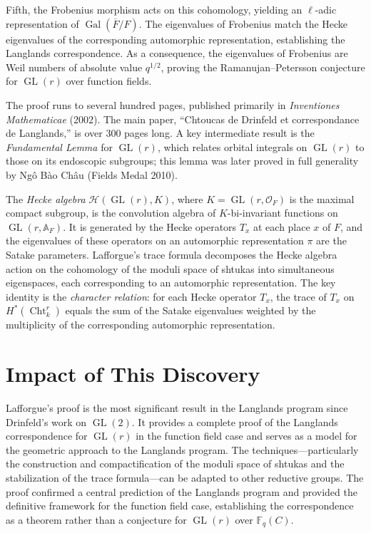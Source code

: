 Fifth, the Frobenius morphism acts on this cohomology, yielding an $\ell$-adic representation of $\operatorname{Gal}(\overline{F}/F)$. The eigenvalues of Frobenius match the Hecke eigenvalues of the corresponding automorphic representation, establishing the Langlands correspondence. As a consequence, the eigenvalues of Frobenius are Weil numbers of absolute value $q^{1/2}$, proving the Ramanujan--Petersson conjecture for $\operatorname{GL}(r)$ over function fields.

The proof runs to several hundred pages, published primarily in \emph{Inventiones Mathematicae} (2002). The main paper, ``Chtoucas de Drinfeld et correspondance de Langlands,'' is over 300 pages long. A key intermediate result is the \emph{Fundamental Lemma} for $\operatorname{GL}(r)$, which relates orbital integrals on $\operatorname{GL}(r)$ to those on its endoscopic subgroups; this lemma was later proved in full generality by Ngô Bào Châu (Fields Medal 2010).

The \emph{Hecke algebra} $\mathcal{H}(\operatorname{GL}(r), K)$, where $K = \operatorname{GL}(r, \mathcal{O}_F)$ is the maximal compact subgroup, is the convolution algebra of $K$-bi-invariant functions on $\operatorname{GL}(r, \mathbb{A}_F)$. It is generated by the Hecke operators $T_x$ at each place $x$ of $F$, and the eigenvalues of these operators on an automorphic representation $\pi$ are the Satake parameters. Lafforgue's trace formula decomposes the Hecke algebra action on the cohomology of the moduli space of shtukas into simultaneous eigenspaces, each corresponding to an automorphic representation. The key identity is the \emph{character relation}: for each Hecke operator $T_x$, the trace of $T_x$ on $H^*(\operatorname{Cht}^r_k)$ equals the sum of the Satake eigenvalues weighted by the multiplicity of the corresponding automorphic representation.

\section{Impact of This Discovery}

Lafforgue's proof is the most significant result in the Langlands program since Drinfeld's work on $\operatorname{GL}(2)$. It provides a complete proof of the Langlands correspondence for $\operatorname{GL}(r)$ in the function field case and serves as a model for the geometric approach to the Langlands program. The techniques---particularly the construction and compactification of the moduli space of shtukas and the stabilization of the trace formula---can be adapted to other reductive groups. The proof confirmed a central prediction of the Langlands program and provided the definitive framework for the function field case, establishing the correspondence as a theorem rather than a conjecture for $\operatorname{GL}(r)$ over $\mathbb{F}_q(C)$.

